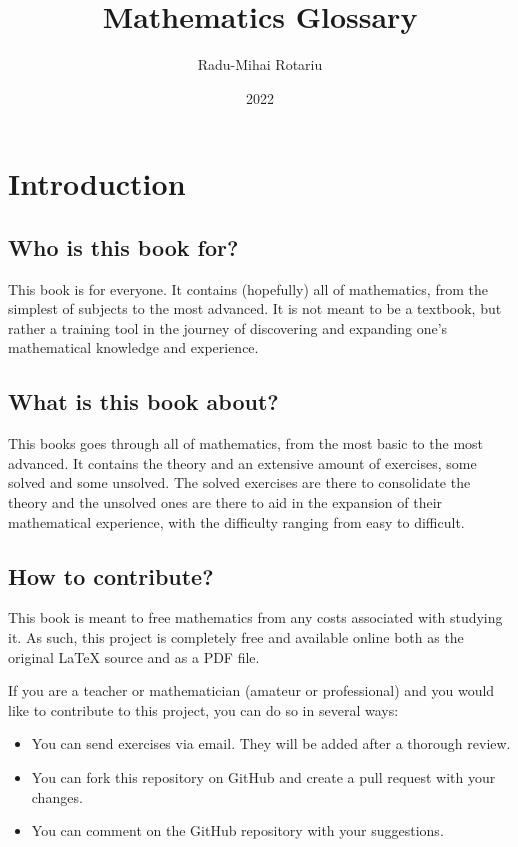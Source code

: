 \documentclass[a4paper]{book}
\title{Mathematics Glossary}
\author{Radu-Mihai Rotariu}
\date{2022}
\begin{document}
\maketitle

\tableofcontents

\chapter{Introduction}
\section{Who is this book for?}
This book is for everyone. It contains (hopefully) all of mathematics, from the simplest of subjects
to the most advanced. It is not meant to be a textbook, but rather a training tool in the journey
of discovering and expanding one's mathematical knowledge and experience.

\section{What is this book about?}
This books goes through all of mathematics, from the most basic to the most advanced. It contains
the theory and an extensive amount of exercises, some solved and some unsolved. The solved exercises
are there to consolidate the theory and the unsolved ones are there to aid in the expansion of their
mathematical experience, with the difficulty ranging from easy to difficult.

\section{How to contribute?}
This book is meant to free mathematics from any costs associated with studying it. As such, this project
is completely free and available online both as the original LaTeX source and as a PDF file.

If you are a teacher or mathematician (amateur or professional) and you would like to contribute to
this project, you can do so in several ways:
\begin{itemize}
    \item You can send exercises via email. They will be added after a thorough review.
    \item You can fork this repository on GitHub and create a pull request with your changes.
    \item You can comment on the GitHub repository with your suggestions.
\end{itemize}
\end{document}
